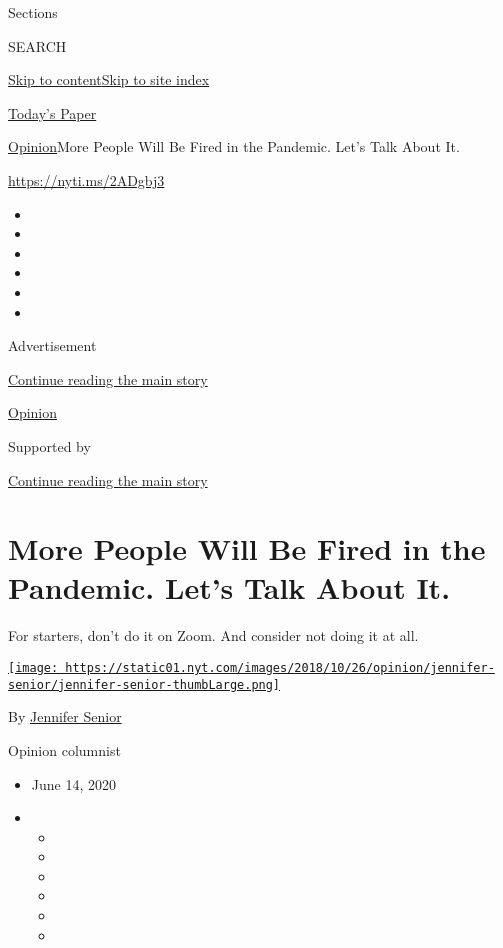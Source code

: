 Sections

SEARCH

\protect\hyperlink{site-content}{Skip to
content}\protect\hyperlink{site-index}{Skip to site index}

\href{https://myaccount.nytimes.com/auth/login?response_type=cookie\&client_id=vi}{}

\href{https://www.nytimes.com/section/todayspaper}{Today's Paper}

\href{/section/opinion}{Opinion}\textbar{}More People Will Be Fired in
the Pandemic. Let's Talk About It.

\href{https://nyti.ms/2ADgbj3}{https://nyti.ms/2ADgbj3}

\begin{itemize}
\item
\item
\item
\item
\item
\item
\end{itemize}

Advertisement

\protect\hyperlink{after-top}{Continue reading the main story}

\href{/section/opinion}{Opinion}

Supported by

\protect\hyperlink{after-sponsor}{Continue reading the main story}

\hypertarget{more-people-will-be-fired-in-the-pandemic-lets-talk-about-it}{%
\section{More People Will Be Fired in the Pandemic. Let's Talk About
It.}\label{more-people-will-be-fired-in-the-pandemic-lets-talk-about-it}}

For starters, don't do it on Zoom. And consider not doing it at all.

\href{https://www.nytimes.com/by/jennifer-senior}{\texttt{[image: https://static01.nyt.com/images/2018/10/26/opinion/jennifer-senior/jennifer-senior-thumbLarge.png]}}

By \href{https://www.nytimes.com/by/jennifer-senior}{Jennifer Senior}

Opinion columnist

\begin{itemize}
\item
  June 14, 2020
\item
  \begin{itemize}
  \item
  \item
  \item
  \item
  \item
  \item
  \end{itemize}
\end{itemize}

